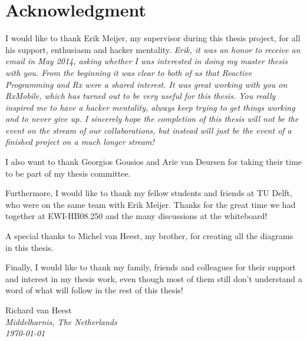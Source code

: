 \chapter*{Acknowledgment}

I would like to thank Erik Meijer, my supervisor during this thesis project, for all his support, enthusiasm and hacker mentality. \textit{Erik, it was an honor to receive an email in May 2014, asking whether I was interested in doing my master thesis with you. From the beginning it was clear to both of us that Reactive Programming and Rx were a shared interest. It was great working with you on RxMobile, which has turned out to be very useful for this thesis. You really inspired me to have a hacker mentality, always keep trying to get things working and to never give up. I sincerely hope the completion of this thesis will not be the  event on the stream of our collaborations, but instead will just be the  event of a finished project on a much longer stream!}

I also want to thank Georgios Gousios and Arie van Deursen for taking their time to be part of my thesis committee.

Furthermore, I would like to thank my fellow students and friends at TU Delft, who were on the same team with Erik Meijer. Thanks for the great time we had together at EWI-HB08.250 and the many discussions at the whiteboard!

A special thanks to Michel van Heest, my brother, for creating all the diagrams in this thesis.

Finally, I would like to thank my family, friends and colleagues for their support and interest in my thesis work, even though most of them still don't understand a word of what will follow in the rest of this thesis!

\begin{flushright}
Richard van Heest\\
\textit{Middelharnis, The Netherlands}\\
\textit{\monthyeardate\today}
\end{flushright}